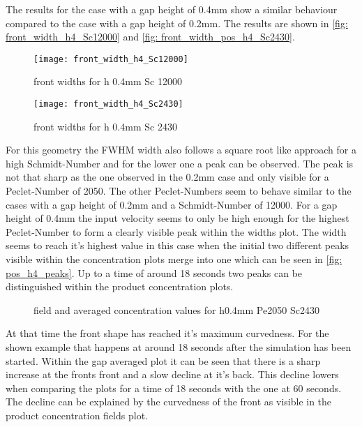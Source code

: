 \documentclass[../thesis.tex]{subfiles}
\begin{document}
The results for the case with a gap height of 0.4mm show a similar behaviour compared to the case with a gap height of 0.2mm. The results are shown in \autoref{fig: front_width_h4_Sc12000} and \autoref{fig: front_width_pos_h4_Sc2430}.
\begin{figure}[htbp]
	\centering
	\texttt{[image: front\_width\_h4\_Sc12000]}
	\caption{front widths for h 0.4mm Sc 12000\label{fig: front_width_h4_Sc12000}}\bigskip
	\texttt{[image: front\_width\_h4\_Sc2430]}
	\caption{front widths for h 0.4mm Sc 2430\label{fig: front_width_pos_h4_Sc2430}}
\end{figure}
 For this geometry the FWHM width also follows a square root like approach for a high Schmidt-Number and for the lower one a peak can be observed. The peak is not that sharp as the one observed in the 0.2mm case and only visible for a Peclet-Number of 2050. The other Peclet-Numbers seem to behave similar to the cases with a gap height of 0.2mm and a Schmidt-Number of 12000. For a gap height of 0.4mm the input velocity seems to only be high enough for the highest Peclet-Number to form a clearly visible peak within the widths plot. The width seems to reach it's highest value in this case when the initial two different peaks visible within the concentration plots merge into one which can be seen in \autoref{fig: pos_h4_peaks}. Up to a time of around 18 seconds two peaks can be distinguished within the product concentration plots. 
\begin{figure}[htb]
	\centering
	\qquad
	\caption{field and averaged concentration values for h0.4mm Pe2050 Sc2430}%
	\label{fig: pos_h4_peaks}%
\end{figure}
At that time the front shape has reached it's maximum curvedness. For the shown example that happens at around 18 seconds after the simulation has been started. Within the gap averaged plot it can be seen that there is a sharp increase at the fronts front and a slow decline at it's back. This decline lowers when comparing the plots for a time of 18 seconds with the one at 60 seconds. The decline can be explained by the curvedness of the front as visible in the product concentration fields plot.
\newline
\end{document}
